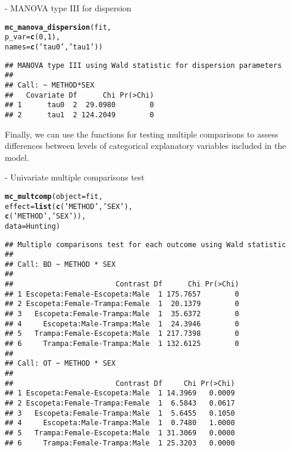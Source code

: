 \documentclass[article]{jss}\usepackage[]{graphicx}\usepackage[]{xcolor}
\makeatletter
\newcommand{\hlnum}[1]{\textcolor[rgb]{0.686,0.059,0.569}{#1}}%
\newcommand{\hlstr}[1]{\textcolor[rgb]{0.192,0.494,0.8}{#1}}%
\newcommand{\hlstd}[1]{\textcolor[rgb]{0.345,0.345,0.345}{#1}}%
\newcommand{\hlkwc}[1]{\textcolor[rgb]{0.333,0.667,0.333}{#1}}%
\newcommand{\hlkwd}[1]{\textcolor[rgb]{0.737,0.353,0.396}{\textbf{#1}}}%
\newenvironment{kframe}{%
 \def\at@end@of@kframe{}%
 \ifinner\ifhmode%
  \def\at@end@of@kframe{\end{minipage}}%
  \begin{minipage}{\columnwidth}%
 \fi\fi%
 \def\FrameCommand##1{\hskip\@totalleftmargin \hskip-\fboxsep
 \colorbox{shadecolor}{##1}\hskip-\fboxsep
     \hskip-\linewidth \hskip-\@totalleftmargin \hskip\columnwidth}%
 \MakeFramed {\advance\hsize-\width
   \@totalleftmargin\z@ \linewidth\hsize
   \@setminipage}}%
 {\par\unskip\endMakeFramed%
 \at@end@of@kframe}
\newenvironment{knitrout}{}{} %
\makeatother
\begin{document}
 - MANOVA type III for dispersion

\begin{knitrout}
\color{fgcolor}\begin{kframe}
\begin{alltt}
\hlkwd{mc_manova_dispersion}\hlstd{(fit,}
                     \hlkwc{p_var} \hlstd{=} \hlkwd{c}\hlstd{(}\hlnum{0}\hlstd{,}\hlnum{1}\hlstd{),}
                     \hlkwc{names} \hlstd{=} \hlkwd{c}\hlstd{(}\hlstr{'tau0'}\hlstd{,} \hlstr{'tau1'}\hlstd{))}
\end{alltt}
\begin{verbatim}
## MANOVA type III using Wald statistic for dispersion parameters
## 
## Call: ~ METHOD*SEX
##   Covariate Df      Chi Pr(>Chi)
## 1      tau0  2  29.0980        0
## 2      tau1  2 124.2049        0
\end{verbatim}
\end{kframe}
\end{knitrout}

Finally, we can use the functions for testing multiple comparisons to assess differences between levels of categorical explanatory variables included in the model. 

 - Univariate multiple comparisons test

\begin{knitrout}
\color{fgcolor}\begin{kframe}
\begin{alltt}
\hlkwd{mc_multcomp}\hlstd{(}\hlkwc{object} \hlstd{= fit,}
            \hlkwc{effect} \hlstd{=} \hlkwd{list}\hlstd{(}\hlkwd{c}\hlstd{(}\hlstr{'METHOD'}\hlstd{,} \hlstr{'SEX'}\hlstd{),}
                          \hlkwd{c}\hlstd{(}\hlstr{'METHOD'}\hlstd{,} \hlstr{'SEX'}\hlstd{)),}
            \hlkwc{data} \hlstd{= Hunting)}
\end{alltt}
\begin{verbatim}
## Multiple comparisons test for each outcome using Wald statistic
## 
## Call: BD ~ METHOD * SEX
## 
##                        Contrast Df      Chi Pr(>Chi)
## 1 Escopeta:Female-Escopeta:Male  1 175.7657        0
## 2 Escopeta:Female-Trampa:Female  1  20.1379        0
## 3   Escopeta:Female-Trampa:Male  1  35.6372        0
## 4     Escopeta:Male-Trampa:Male  1  24.3946        0
## 5   Trampa:Female-Escopeta:Male  1 217.7398        0
## 6     Trampa:Female-Trampa:Male  1 132.6125        0
## 
## Call: OT ~ METHOD * SEX
## 
##                        Contrast Df     Chi Pr(>Chi)
## 1 Escopeta:Female-Escopeta:Male  1 14.3969   0.0009
## 2 Escopeta:Female-Trampa:Female  1  6.5843   0.0617
## 3   Escopeta:Female-Trampa:Male  1  5.6455   0.1050
## 4     Escopeta:Male-Trampa:Male  1  0.7480   1.0000
## 5   Trampa:Female-Escopeta:Male  1 31.3069   0.0000
## 6     Trampa:Female-Trampa:Male  1 25.3203   0.0000
\end{verbatim}
\end{kframe}
\end{knitrout}
\end{document}
